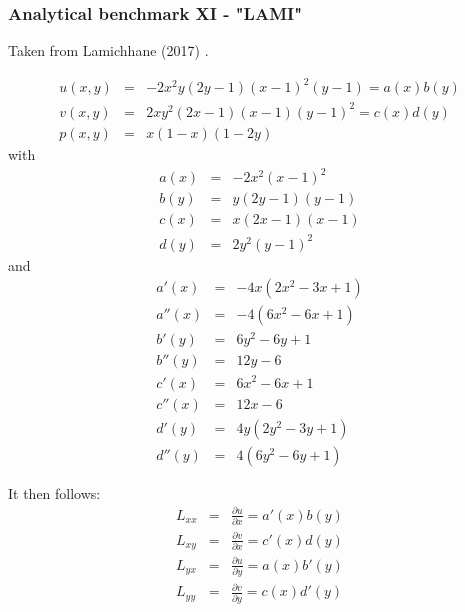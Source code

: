




\subsubsection{Analytical benchmark XI \label{ss:mms11} - "LAMI"}

Taken from Lamichhane (2017) \cite{lami17}.

\begin{eqnarray}
u(x,y)&=&-2x^2y(2y-1)(x-1)^2(y-1) = a(x)b(y)\\
v(x,y)&=& 2xy^2(2x-1)(x-1)(y-1)^2 = c(x)d(y)\\
p(x,y)&=& x(1-x)(1-2y)
\end{eqnarray}
with
\begin{eqnarray}
a(x)&=&-2x^2(x-1)^2  \\
b(y)&=& y(2y-1)(y-1) \\ 
c(x)&=& x(2x-1)(x-1) \\
d(y)&=& 2y^2(y-1)^2
\end{eqnarray}
and 
\begin{eqnarray}
a'(x) &=&  -4x(2x^2-3x+1)\\
a''(x)&=&  -4(6x^2-6x+1) \\
b'(y) &=&  6y^2-6y+1 \\
b''(y)&=&  12y-6 \\
c'(x) &=& 6x^2-6x+1 \\
c''(x)&=& 12x-6  \\
d'(y) &=& 4y(2y^2-3y+1)  \\
d''(y)&=&  4(6y^2-6y+1)  
\end{eqnarray}



It then follows:
\begin{eqnarray}
{L}_{xx} &=& \frac{\partial u}{\partial x} =a'(x) b(y)\\ 
{L}_{xy} &=& \frac{\partial v}{\partial x} =c'(x) d(y)\\
{L}_{yx} &=& \frac{\partial u}{\partial y} =a(x) b'(y)\\
{L}_{yy} &=& \frac{\partial v}{\partial y} =c(x) d'(y)
\end{eqnarray}

